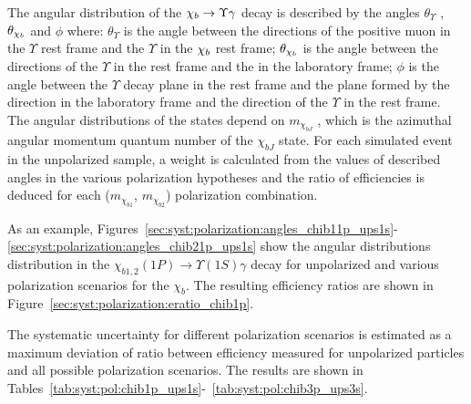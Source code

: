 The angular distribution of the $\chi_{b} \rightarrow \Upsilon \gamma$ decay is described
by the angles $\theta_{\Upsilon}$ , $\theta_{\chi_{b}}$ and $\phi$ where:
$\theta_{\Upsilon}$ is the angle between the directions of the positive muon in
the $\Upsilon$ rest frame and the $\Upsilon$ in the $\chi_{b}$ rest frame;
$\theta_{\chi_{b}}$ is the angle between the directions of the $\Upsilon$ in the
\chib rest frame and the \chib in the laboratory frame; $\phi$ is the angle
between the $\Upsilon$ decay plane in the \chib rest frame and the plane formed
by the \chib direction in the laboratory frame and the direction of the
$\Upsilon$ in the \chib rest frame. The angular distributions of the
\chib states depend on $m_{\chi_{bJ}}$ , which is the azimuthal angular
momentum quantum number of the $\chi_{bJ}$ state. For each simulated event in
the unpolarized sample, a weight is calculated from the values of described
angles in the various polarization hypotheses and the ratio of efficiencies is
deduced for each ($m_{\chi_{b1}}$, $m_{\chi_{b2}}$) polarization combination.

As an example,
Figures~\ref{sec:syst:polarization:angles_chib11p_ups1s}-\ref{sec:syst:polarization:angles_chib21p_ups1s}
show the angular distributions distribution in the $\chi_{b1,2}(1P) \to
\Upsilon(1S) \gamma$ decay for unpolarized and various polarization scenarios
for the $\chi_b$. The resulting efficiency ratios are shown in
Figure~\ref{sec:syst:polarization:eratio_chib1p}.





The systematic uncertainty for different polarization scenarios is estimated
as a maximum deviation of ratio between efficiency measured for unpolarized
particles and all possible polarization scenarios. The results  are
shown in Tables~\ref{tab:syst:pol:chib1p_ups1s}-~\ref{tab:syst:pol:chib3p_ups3s}.







